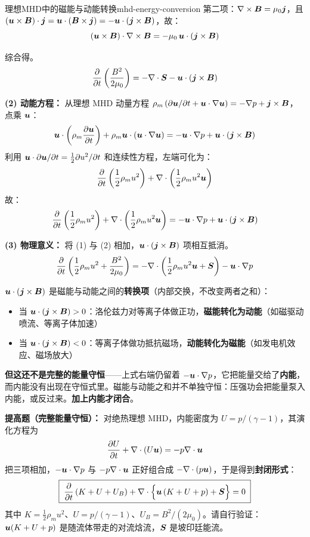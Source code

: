 \begin{example}{理想MHD中的磁能与动能转换}{mhd-energy-conversion}
第二项：$\nabla\times\bm{B} = \mu_0\bm{j}$，且 $(\bm{u}\times\bm{B})\cdot\bm{j} = \bm{u}\cdot(\bm{B}\times\bm{j}) = -\bm{u}\cdot(\bm{j}\times\bm{B})$，故：
\[
(\bm{u}\times\bm{B})\cdot\nabla\times\bm{B} = -\mu_0\,\bm{u}\cdot(\bm{j}\times\bm{B})
\]

综合得。
\[
\frac{\partial}{\partial t}\left(\frac{B^2}{2\mu_0}\right) = -\nabla\cdot\bm{S} - \bm{u}\cdot(\bm{j}\times\bm{B})
\]

\textbf{(2) 动能方程：}
从理想 MHD 动量方程 $\rho_m\left(\partial\bm{u}/\partial t + \bm{u}\cdot\nabla\bm{u}\right) = -\nabla p + \bm{j}\times\bm{B}$，点乘 $\bm{u}$：
\[
\bm{u}\cdot\left(\rho_m\frac{\partial\bm{u}}{\partial t}\right) + \rho_m\bm{u}\cdot(\bm{u}\cdot\nabla\bm{u}) = -\bm{u}\cdot\nabla p + \bm{u}\cdot(\bm{j}\times\bm{B})
\]
利用 $\bm{u}\cdot\partial\bm{u}/\partial t = \frac{1}{2}\partial u^2/\partial t$ 和连续性方程，左端可化为：
\[
\frac{\partial}{\partial t}\left(\frac{1}{2}\rho_m u^2\right) + \nabla\cdot\left(\frac{1}{2}\rho_m u^2\bm{u}\right)
\]
故：
\[
\frac{\partial}{\partial t}\left(\frac{1}{2}\rho_m u^2\right) + \nabla\cdot\left(\frac{1}{2}\rho_m u^2\bm{u}\right) = -\bm{u}\cdot\nabla p + \bm{u}\cdot(\bm{j}\times\bm{B})
\]

\textbf{(3) 物理意义：}
将 (1) 与 (2) 相加，$\bm{u}\cdot(\bm{j}\times\bm{B})$ 项相互抵消。
\[
\frac{\partial}{\partial t}\left(\frac{1}{2}\rho_m u^2 + \frac{B^2}{2\mu_0}\right) = -\nabla\cdot\left(\frac{1}{2}\rho_m u^2\bm{u} + \bm{S}\right) - \bm{u}\cdot\nabla p
\]

$\bm{u}\cdot(\bm{j}\times\bm{B})$ 是磁能与动能之间的\textbf{转换项}（内部交换，不改变两者之和）：
\begin{itemize}[leftmargin=*,itemsep=0pt]
\item 当 $\bm{u}\cdot(\bm{j}\times\bm{B}) > 0$：洛伦兹力对等离子体做正功，\textbf{磁能转化为动能}（如磁驱动喷流、等离子体加速）
\item 当 $\bm{u}\cdot(\bm{j}\times\bm{B}) < 0$：等离子体做功抵抗磁场，\textbf{动能转化为磁能}（如发电机效应、磁场放大）
\end{itemize}

\textbf{但这还不是完整的能量守恒}——上式右端仍留着 $-\bm{u}\cdot\nabla p$，它把能量交给了\textbf{内能}，而内能没有出现在守恒式里。磁能与动能之和并不单独守恒：压强功会把能量泵入内能，或反过来。\textbf{加上内能才闭合}。

\textbf{提高题（完整能量守恒）：} 对绝热理想 MHD，内能密度为 $U = p/(\gamma-1)$，其演化方程为
\[
\frac{\partial U}{\partial t} + \nabla\cdot(U\bm{u}) = -p\nabla\cdot\bm{u}
\]
把三项相加，$-\bm{u}\cdot\nabla p$ 与 $-p\nabla\cdot\bm{u}$ 正好组合成 $-\nabla\cdot(p\bm{u})$，于是得到\textbf{封闭形式}：
\[
\boxed{\;\frac{\partial}{\partial t}\left(K + U + U_B\right) + \nabla\cdot\Bigl\{\bm{u}\left(K + U + p\right) + \bm{S}\Bigr\} = 0\;}
\]
其中 $K=\tfrac12\rho_mu^2$、$U=p/(\gamma-1)$、$U_B=B^2/(2\mu_0)$。请自行验证：$\bm{u}(K+U+p)$ 是随流体带走的对流焓流，$\bm{S}$ 是坡印廷能流。


\end{example}
